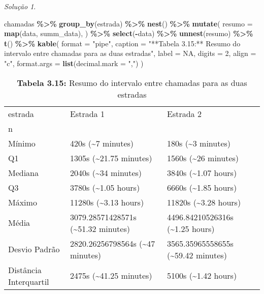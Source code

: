 \documentclass[
]{latex/krantz}
\newenvironment{Shaded}{\begin{snugshade}}{\end{snugshade}}
\newcommand{\AttributeTok}[1]{\textcolor[rgb]{0.13,0.29,0.53}{#1}}
\newcommand{\ConstantTok}[1]{\textcolor[rgb]{0.56,0.35,0.01}{#1}}
\newcommand{\DecValTok}[1]{\textcolor[rgb]{0.00,0.00,0.81}{#1}}
\newcommand{\FunctionTok}[1]{\textcolor[rgb]{0.13,0.29,0.53}{\textbf{#1}}}
\newcommand{\NormalTok}[1]{#1}
\newcommand{\SpecialCharTok}[1]{\textcolor[rgb]{0.81,0.36,0.00}{\textbf{#1}}}
\newcommand{\StringTok}[1]{\textcolor[rgb]{0.31,0.60,0.02}{#1}}
\theoremstyle{definition}
\theoremstyle{definition}
\theoremstyle{definition}
\theoremstyle{definition}
\theoremstyle{remark}
\newtheorem*{solution}{Solução}
\begin{document}
\begin{solution}
\begin{Shaded}
\begin{Highlighting}[]
\NormalTok{chamadas }\SpecialCharTok{\%\textgreater{}\%}
  \FunctionTok{group\_by}\NormalTok{(estrada) }\SpecialCharTok{\%\textgreater{}\%}
  \FunctionTok{nest}\NormalTok{() }\SpecialCharTok{\%\textgreater{}\%}
  \FunctionTok{mutate}\NormalTok{(}
    \AttributeTok{resumo =} \FunctionTok{map}\NormalTok{(data, summ\_data),}
\NormalTok{  ) }\SpecialCharTok{\%\textgreater{}\%}
  \FunctionTok{select}\NormalTok{(}\SpecialCharTok{{-}}\NormalTok{data) }\SpecialCharTok{\%\textgreater{}\%}
  \FunctionTok{unnest}\NormalTok{(resumo) }\SpecialCharTok{\%\textgreater{}\%}
  \FunctionTok{t}\NormalTok{() }\SpecialCharTok{\%\textgreater{}\%}
  \FunctionTok{kable}\NormalTok{(}
    \AttributeTok{format =} \StringTok{"pipe"}\NormalTok{,}
    \AttributeTok{caption =} \StringTok{"**Tabela 3.15:** Resumo do intervalo entre chamadas para as duas estradas"}\NormalTok{,}
    \AttributeTok{label =} \ConstantTok{NA}\NormalTok{,}
    \AttributeTok{digits =} \DecValTok{2}\NormalTok{,}
    \AttributeTok{align =} \StringTok{"c"}\NormalTok{,}
    \AttributeTok{format.args =} \FunctionTok{list}\NormalTok{(}\AttributeTok{decimal.mark =} \StringTok{","}\NormalTok{)}
\NormalTok{  )}
\end{Highlighting}
\end{Shaded}

\begin{longtable}[]{@{}
  >{\raggedright\arraybackslash}p{}
  >{\centering\arraybackslash}p{}
  >{\centering\arraybackslash}p{}@{}}
\caption{\textbf{Tabela 3.15:} Resumo do intervalo entre chamadas para as duas estradas}\tabularnewline
\toprule\noalign{}
\endfirsthead
\endhead
\bottomrule\noalign{}
\endlastfoot
estrada & Estrada 1 & Estrada 2 \\
n & 28 & 19 \\
Mínimo & 420s (\textasciitilde7 minutes) & 180s (\textasciitilde3 minutes) \\
Q1 & 1305s (\textasciitilde21.75 minutes) & 1560s (\textasciitilde26 minutes) \\
Mediana & 2040s (\textasciitilde34 minutes) & 3840s (\textasciitilde1.07 hours) \\
Q3 & 3780s (\textasciitilde1.05 hours) & 6660s (\textasciitilde1.85 hours) \\
Máximo & 11280s (\textasciitilde3.13 hours) & 11820s (\textasciitilde3.28 hours) \\
Média & 3079.28571428571s (\textasciitilde51.32 minutes) & 4496.84210526316s (\textasciitilde1.25 hours) \\
Desvio Padrão & 2820.26256798564s (\textasciitilde47 minutes) & 3565.35965558655s (\textasciitilde59.42 minutes) \\
Distância Interquartil & 2475s (\textasciitilde41.25 minutes) & 5100s (\textasciitilde1.42 hours) \\
\end{longtable}


\end{solution}
\end{document}
